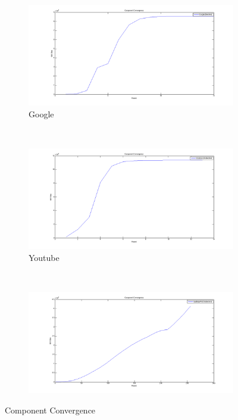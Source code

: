 \begin{figure}
    \centering
    \begin{subfigure}[htbp]{0.8\textwidth}
            \includegraphics[width=\textwidth]{FIG/cp-google-c.png}
            \caption{Google}
            \label{fig:cp-google-c}
    \end{subfigure}
    ~ %
    \begin{subfigure}[htbp]{0.8\textwidth}
            \includegraphics[width=\textwidth]{FIG/cp-youtube-c.png}
            \caption{Youtube}
            \label{fig:cp-youtube-c}
    \end{subfigure}
    ~ %
    \begin{subfigure}[htbp]{0.8\textwidth}
            \includegraphics[width=\textwidth]{FIG/cp-pa-c.png}
            \caption{}
            \label{fig:cp-pa-c.png}
    \end{subfigure}
    \caption{Component Convergence}
        \label{fig:results3}
\end{figure} 

